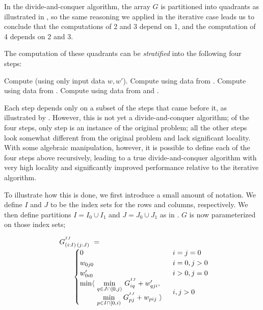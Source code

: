 In the divide-and-conquer algorithm, the array $G$ is partitioned into
quadrants as illustrated in , so the same reasoning we applied 
in the iterative case leads us to conclude that the computations of 2 and 3 depend on 1,
and the computation of 4 depends on 2 and 3.

The computation of these quadrants can be \emph{stratified} into the following
four steps:
\begin{algorithmic}[1]
  \STATE Compute  (using only input data $w,w'$).
  \STATE Compute  using data from .
  \STATE Compute  using data from .
  \STATE Compute  using data from  and .
\end{algorithmic}
Each step depends only on a subset of the steps that came before it, 
as illustrated by . However, this is not yet a divide-and-conquer algorithm; 
of the four steps, only step  is an instance of the original problem; all the other steps
look somewhat different from the original problem and lack significant locality. With some algebraic manipulation, however, 
it is possible to define each of the four steps above recursively, leading to a true divide-and-conquer algorithm with very high locality 
and significantly improved performance relative to the iterative algorithm.

To illustrate how this is done, we first introduce a small amount of notation. 
We define $I$ and $J$ to be the index sets for the rows and columns, respectively.
We then define partitions $I=I_0\cup I_1$ and $J=J_0\cup J_1$ as in .
$G$ is now parameterized on those index sets;

\begin{equation}
\begin{array}{l@{}l}
	G^{^{IJ}}_{(i:I)\,(j:J)} ~=~  \\
	\qquad
	\begin{cases}
		0                         & i=j=0 \\
		w_{0j0}                   & i=0, j>0 \\
		w'_{0i0}                  & i>0, j=0 \\
		\begin{array}{@{}l@{~}l}
		  \min\langle & \underset{q\in J\cap[0,j)}\min ~ G^{^{IJ}}_{iq} + \yw{qji}, \\
		              & \underset{p\in I\cap[0,i)}\min ~ G^{^{IJ}}_{pj} + \xw{pij}~\rangle
		\end{array}              & i,j>0
	\end{cases}
\end{array}
\end{equation}

